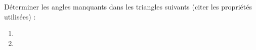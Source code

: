 
\begin{exercice}\label{exo2smath-0254}

    Déterminer les angles manquants dans les triangles suivants (citer les propriétés utilisées) :
    \begin{enumerate}
        \item
   
\item
   

    \end{enumerate}

\end{exercice}
